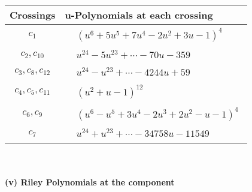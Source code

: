 \documentclass[1p]{elsarticle_modified}
\theoremstyle{definition}
\begin{document}
\begin{tabular}{m{50pt}|m{274pt}}
Crossings & \hspace{64pt}u-Polynomials at each crossing \\
\hline $$\begin{aligned}c_{1}\end{aligned}$$&$\begin{aligned}
&(u^6+5 u^5+7 u^4-2 u^2+3 u-1)^4
\end{aligned}$\\
\hline $$\begin{aligned}c_{2},c_{10}\end{aligned}$$&$\begin{aligned}
&u^{24}-5 u^{23}+\cdots-70 u-359
\end{aligned}$\\
\hline $$\begin{aligned}c_{3},c_{8},c_{12}\end{aligned}$$&$\begin{aligned}
&u^{24}- u^{23}+\cdots-4244 u+59
\end{aligned}$\\
\hline $$\begin{aligned}c_{4},c_{5},c_{11}\end{aligned}$$&$\begin{aligned}
&(u^2+u-1)^{12}
\end{aligned}$\\
\hline $$\begin{aligned}c_{6},c_{9}\end{aligned}$$&$\begin{aligned}
&(u^6- u^5+3 u^4-2 u^3+2 u^2- u-1)^4
\end{aligned}$\\
\hline $$\begin{aligned}c_{7}\end{aligned}$$&$\begin{aligned}
&u^{24}+u^{23}+\cdots-34758 u-11549
\end{aligned}$\\
\hline
\end{tabular}\\~\\
\newpage\renewcommand{\arraystretch}{1}
\flushleft \textbf{(v) Riley Polynomials at the component}\newline \\
\end{document}
